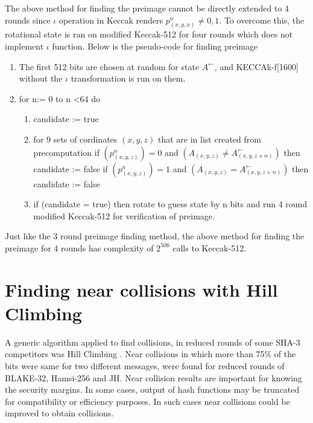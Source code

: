 The above method for finding the preimage cannot be directly extended to 4 rounds since $\iota$ operation in Keccak
renders $p^n_{(x, y, x)} \neq 0, 1$. To overcome this, the rotational state is ran on modified Keccak-512 for four rounds
which does not implement $\iota$ function. Below is the pseudo-code for finding preimage \cite{00022}

\begin{enumerate}
\item The first 512 bits are chosen at random for state $A^{\leftarrow}$, and KECCAk-f[1600] without the $\iota$
transformation is run on them.
\item for n:= 0 to n \textless 64 do
  \begin{enumerate}
  \item candidate := true
  \item for 9 sets of cordinates $(x, y, z)$ that are in list created from precomputation
  \newline if $(p^n_{(x, y, z)}) = 0$ and $(A_{(x, y, z)} \neq A^{\leftarrow}_{(x, y, z+n)})$ then candidate := false
  \newline if $(p^n_{(x, y, z)}) = 1$ and $(A_{(x, y, z)} = A^{\leftarrow}_{(x, y, z+n)})$ then candidate := false
  \item if (candidate = true) then rotate to guess state by n bits and run 4 round modified Keccak-512 for verification
  of preimage.
  \end{enumerate}
\end{enumerate}

Just like the 3 round preimage finding method, the above method for finding the preimage for 4 rounds has complexity of
$2^{506}$ calls to Keccak-512.

\section{Finding near collisions with Hill Climbing}

A generic algorithm applied to find collisions, in reduced rounds of some SHA-3 competitors was Hill Climbing
\cite{00029}. Near collisions in which more than 75\% of the bits were same for two different messages, were found 
for reduced rounds of BLAKE-32, Hamsi-256 and JH. Near collision results are important for knowing the security
margins. In some cases, output of hash functions may be truncated for compatibility or efficiency purposes. In 
such cases near collisions could be improved to obtain collisions.

